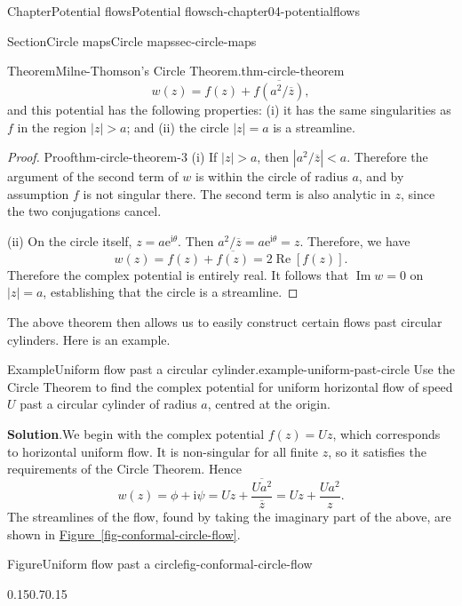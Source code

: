 \documentclass[oneside,10pt,]{book}
\newcommand{\blocktitlefont}{\relax}
\newcommand{\xreffont}{\relax}
\numberwithin{equation}{section}
\renewcommand*{\Re}{\operatorname{Re}}
\renewcommand*{\Im}{\operatorname{Im}}
\newcommand{\e}{\mathrm{e}}
\newcommand{\im}{\mathrm{i}}
\begin{document}
\begin{chapterptx}{Chapter}{Potential flows}{}{Potential flows}{}{}{ch-chapter04-potentialflows}
\begin{sectionptx}{Section}{Circle maps}{}{Circle maps}{}{}{sec-circle-maps}
\begin{theorem}{Theorem}{Milne-Thomson's Circle Theorem.}{}{thm-circle-theorem}
\begin{equation}
w(z) = f(z) + \overline{f(a^2/\overline{z})},\label{eqn-milne-circle-map}
\end{equation}
and this potential has the following properties: (i) it has the same singularities as \(f\) in the region \(|z| > a\); and (ii) the circle \(|z| = a\) is a streamline.%
\end{theorem}
\begin{proof}{Proof}{}{thm-circle-theorem-3}
(i) If \(|z| > a\), then \(|a^2/\overline{z}| < a\). Therefore the argument of the second term of \(w\) is within the circle of radius \(a\), and by assumption \(f\) is not singular there. The second term is also analytic in \(z\), since the two conjugations cancel.%
\par
(ii) On the circle itself, \(z = a\e^{\im\theta}\). Then \(a^2/\overline{z} = a\e^{\im\theta} = z\). Therefore, we have%
\begin{equation*}
w(z) = f(z) + \overline{f(z)} = 2 \Re[f(z)].
\end{equation*}
Therefore the complex potential is entirely real. It follows that \(\Im w = 0\) on \(|z| = a\), establishing that the circle is a streamline.%
\end{proof}
The above theorem then allows us to easily construct certain flows past circular cylinders. Here is an example.%
\begin{example}{Example}{Uniform flow past a circular cylinder.}{example-uniform-past-circle}%
Use the Circle Theorem to find the complex potential for uniform horizontal flow of speed \(U\) past a circular cylinder of radius \(a\), centred at the origin.%
\par\smallskip%
\noindent\textbf{\blocktitlefont Solution}.\hypertarget{example-uniform-past-circle-3}{}\quad{}We begin with the complex potential \(f(z) = Uz\), which corresponds to horizontal uniform flow. It is non-singular for all finite \(z\), so it satisfies the requirements of the Circle Theorem. Hence%
\begin{equation}
w(z) = \phi + \im \psi = Uz + \overline{\frac{Ua^2}{\overline{z}}} = Uz + \frac{Ua^2}{z}.\label{eqn-potential-uniform-past-circle}
\end{equation}
The streamlines of the flow, found by taking the imaginary part of the above, are shown in \hyperref[fig-conformal-circle-flow]{Figure~{\xreffont\ref{fig-conformal-circle-flow}}}.%
\begin{figureptx}{Figure}{Uniform flow past a circle}{fig-conformal-circle-flow}{}%
\begin{image}{0.15}{0.7}{0.15}{}%

\end{image}
\end{figureptx}
\end{example}
\end{sectionptx}
\end{chapterptx}
\end{document}
